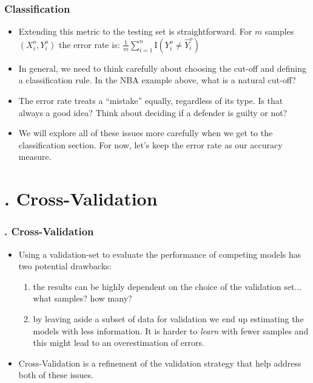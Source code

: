 \documentclass[flegn]{beamer}
\begin{document}
\begin{frame}
\frametitle{Classification}
\begin{itemize}
\item Extending this metric to the testing set is straightforward. For $m$ samples  $(X^o_i,Y^o_i)$ the error rate is:
$
\frac{1}{m} \sum_{i=1}^n \mbox{I}(Y^o_i \neq \hat{Y}^o_i)
$
\item In general, we need to think carefully about choosing the cut-off and defining a classification rule. In the NBA example above, what is a natural cut-off? 
\item The error rate treats a {\color{red}``mistake''} equally, regardless of its type. Is that always a good idea? Think about deciding if a defender is guilty or not? 
\item We will explore all of these issues more carefully when we get to the classification section. For now, let's keep the error rate as our accuracy measure.
\end{itemize}

\end{frame}

\section{. Cross-Validation}
\begin{frame}
\frametitle{. Cross-Validation}
\begin{itemize}
\item Using a {\color{blue}validation-set} to evaluate the performance of competing models has two potential drawbacks: 
\begin{enumerate}
\item the results can be highly dependent on the choice of the validation set... what samples? how many?
\item by leaving aside a subset of data for validation we end up estimating the models with less information. It is harder to {\it learn} with fewer samples and this might lead to an overestimation of errors.  
\end{enumerate}
\item {\color{blue} Cross-Validation} is a refinement of the validation strategy that help address both of these issues.
\end{itemize}

\end{frame}
\end{document}
